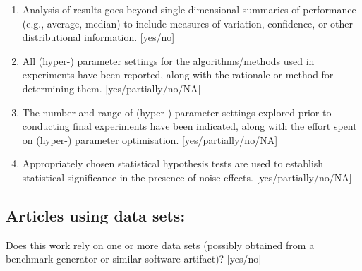 \begin{enumerate}
    \item 
    Analysis of results goes beyond single-dimensional summaries of performance (e.g., average, median) to include measures of variation, confidence, or other distributional information. 
    [yes/no]
    \item 
    All (hyper-) parameter settings for 
    the algorithms/methods used in experiments have been reported, along with the rationale or method for determining them. 
    [yes/partially/no/NA]
    \item 
    The number and range of (hyper-) parameter settings explored prior to conducting final experiments have been indicated, along with the effort spent on (hyper-) parameter optimisation. 
    [yes/partially/no/NA]
    \item 
    Appropriately chosen statistical hypothesis tests are used to establish statistical significance
    in the presence of noise effects.
    [yes/partially/no/NA]
\end{enumerate}


\subsection*{Articles using data sets:}
Does this work rely on one or more data sets (possibly obtained from a benchmark generator or similar software artifact)? 
[yes/no]

